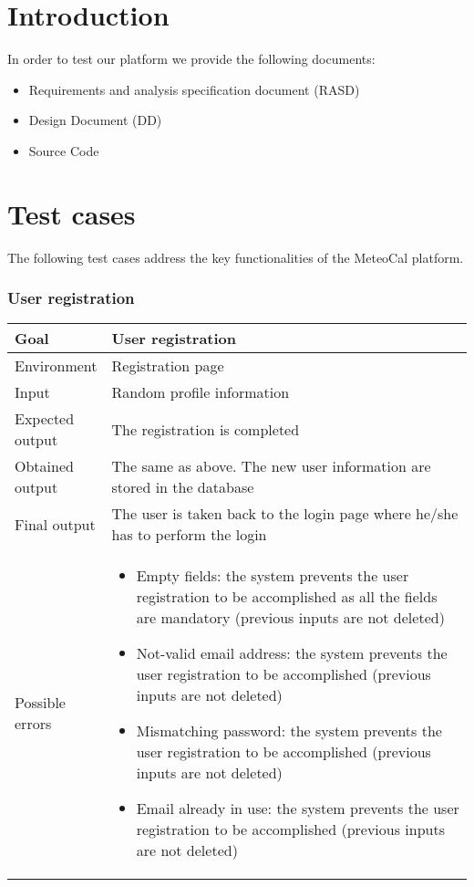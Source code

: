 \documentclass[10pt,a4paper,titlepage]{article}
\begin{document}


\tableofcontents

\pagebreak
\part{Introduction}
In order to test our platform we provide the following documents:
\begin{itemize}
\item Requirements and analysis specification document (RASD)
\item Design Document (DD)
\item Source Code
\end{itemize}

\pagebreak
\part{Test cases}
The following test cases address the key functionalities of the MeteoCal platform.

\section{User registration}
\begin{tabular}{| p{0.2\linewidth} | p{0.8\linewidth} |}
\hline Goal & User registration\\
\hline Environment & Registration page\\
\hline Input & Random profile information \\
\hline Expected output & The registration is completed \\
\hline Obtained output & The same as above. The new user information are stored in the database \\
\hline Final output & The user is taken back to the login page where he/she has to perform the login \\
\hline Possible errors &
\begin{itemize}
\item  Empty fields: the system prevents the user registration to be
accomplished as all the fields are mandatory (previous inputs are not
deleted)
\item Not-valid email address: the system prevents the user registration to be
accomplished (previous inputs are not deleted)
\item Mismatching password: the system prevents the user registration to be
accomplished (previous inputs are not deleted)
\item Email already in use: the system prevents the user registration to be
accomplished (previous inputs are not deleted)
\end{itemize}\\
\hline
\end{tabular}
\end{document}

